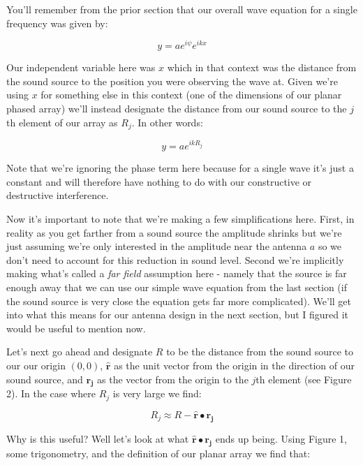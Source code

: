 \documentclass[10pt,a5paper]{book}
\begin{document}
You'll remember from the prior section that our overall wave equation for a single frequency was given by:

\begin{equation}
y = a e^{i\psi}e^{ikx}
\end{equation}

Our independent variable here was $x$ which in that context was the distance from the sound source to the position you were observing the wave at. Given we're using $x$ for something else in this context (one of the dimensions of our planar phased array) we'll instead designate the distance from our sound source to the $j$th element of our array as $R_j$. In other words:


\begin{equation}
y = a e^{ikR_j}
\end{equation}

Note that we're ignoring the phase term here because for a single wave it's just a constant and will therefore have nothing to do with our constructive or destructive interference. 

Now it's important to note that we're making a  few simplifications here. First, in reality as you get farther from a sound source the amplitude shrinks but we're just assuming we're only interested in the amplitude near the antenna $a$ so we don't need to account for this reduction in sound level. Second we're implicitly making what's called a \textit{far field} assumption here - namely that the source is far enough away that we can use our simple wave equation from the last section (if the sound source is very close the equation gets far more complicated). We'll get into what this means for our antenna design in the next section, but I figured it would be useful to mention now. 

Let's next go ahead and designate $R$ to be the distance from the sound source to our our origin $(0,0)$, $\mathbf{\hat{r}}$ as the unit vector from the origin in the direction of our sound source, and $\mathbf{r_j}$ as the vector from the origin to the $j$th element (see Figure 2). In the case where $R_j$ is very large we find:

\begin{equation}
R_j \approx R - \mathbf{\hat{r}}\bullet\mathbf{r_j}
\end{equation}

Why is this useful? Well let's look at what $\mathbf{\hat{r}}\bullet\mathbf{r_j}$ ends up being. Using Figure 1, some trigonometry, and the definition of our planar array we find that:
\end{document}
